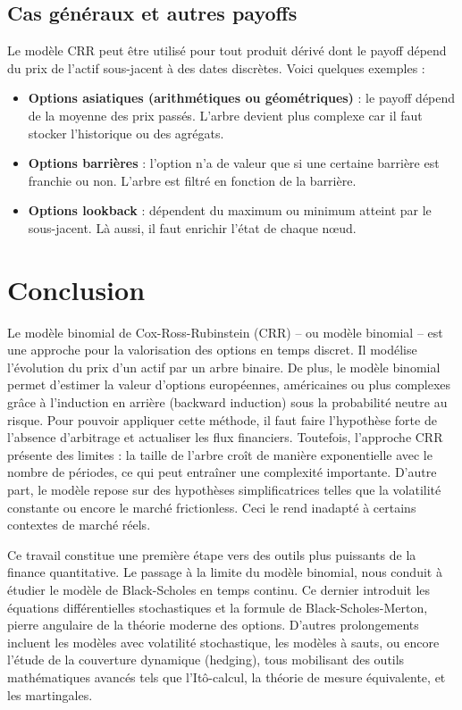 \documentclass[12pt,a4paper]{article}
\begin{document}
\subsection{Cas généraux et autres payoffs}
Le modèle CRR peut être utilisé pour tout produit dérivé dont le payoff dépend du prix de l’actif sous-jacent à des dates discrètes. Voici quelques exemples :
\begin{itemize}
    \item \textbf{Options asiatiques (arithmétiques ou géométriques)} : le payoff dépend de la moyenne des prix passés. L’arbre devient plus complexe car il faut stocker l’historique ou des agrégats.
    \item \textbf{Options barrières} : l’option n’a de valeur que si une certaine barrière est franchie ou non. L’arbre est filtré en fonction de la barrière.
    \item \textbf{Options lookback} : dépendent du maximum ou minimum atteint par le sous-jacent. Là aussi, il faut enrichir l’état de chaque nœud.
\end{itemize}




\newpage 

\section{Conclusion}

Le modèle binomial de Cox-Ross-Rubinstein (CRR) -- ou modèle binomial -- est une approche pour la valorisation des options en temps discret. Il modélise l’évolution du prix d’un actif par un arbre binaire. De plus, le modèle binomial permet d’estimer la valeur d’options européennes, américaines ou plus complexes grâce à l’induction en arrière (backward induction) sous la probabilité neutre au risque. Pour pouvoir appliquer cette méthode, il faut faire l'hypothèse forte de l'absence d'arbitrage et actualiser les flux financiers. Toutefois, l’approche CRR présente des limites : la taille de l’arbre croît de manière exponentielle avec le nombre de périodes, ce qui peut entraîner une complexité importante. D'autre part, le modèle repose sur des hypothèses simplificatrices telles que la volatilité constante ou encore le marché frictionless. Ceci le rend inadapté à certains contextes de marché réels.

Ce travail constitue une première étape vers des outils plus puissants de la finance quantitative. Le passage à la limite du modèle binomial, nous conduit à étudier le modèle de Black-Scholes en temps continu. Ce dernier introduit les équations différentielles stochastiques et la formule de Black-Scholes-Merton, pierre angulaire de la théorie moderne des options. D’autres prolongements incluent les modèles avec volatilité stochastique, les modèles à sauts, ou encore l’étude de la couverture dynamique (hedging), tous mobilisant des outils mathématiques avancés tels que l’Itô-calcul, la théorie de mesure équivalente, et les martingales.
\end{document}
